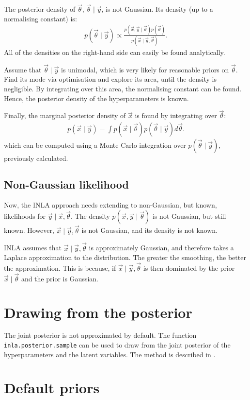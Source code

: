 \documentclass[thesis.tex]{subfiles}
\begin{document}
The posterior density of $\vec{\theta}$, $\vec{\theta }\mid \vec{y}$, is not Gaussian.
Its density (up to a normalising constant) is:
\begin{align}
p(\vec{\theta} \mid \vec{y}) \propto \frac{p(\vec{x}, \vec{y} \mid \vec{\theta}) p(\vec{\theta})}{p(\vec{x} \mid \vec{y}, \vec{\theta})}.
\end{align}
All of the densities on the right-hand side can easily be found analytically.

Assume that $\vec{\theta} \mid \vec{y}$ is unimodal, which is very likely for reasonable priors on $\vec{\theta}$.
Find its mode via optimisation and explore its area, until the density is negligible.
By integrating over this area, the normalising constant can be found.
Hence, the posterior density of the hyperparameters is known.

Finally, the marginal posterior density of $\vec{x}$ is found by integrating over $\vec{\theta}$:
\begin{align}
p(\vec{x} \mid \vec{y}) = \int p(\vec{x} \mid \vec{\theta}) p(\vec{\theta} \mid \vec{y}) d\vec{\theta}.
\end{align}
which can be computed using a Monte Carlo integration over $p(\vec{\theta} \mid \vec{y})$, previously calculated.

\subsection{Non-Gaussian likelihood}

Now, the INLA approach needs extending to non-Gaussian, but known, likelihoods for $\vec{y} \mid \vec{x}, \vec{\theta}$.
The density $p(\vec{x}, \vec{y} \mid \vec{\theta})$ is not Gaussian, but still known.
However, $\vec{x} \mid \vec{y}, \vec{\theta}$ is not Gaussian, and its density is not known.

INLA assumes that $\vec{x} \mid \vec{y}, \vec{\theta}$ is approximately Gaussian, and therefore takes a Laplace approximation to the distribution.
The greater the smoothing, the better the approximation.
This is because, if $\vec{x} \mid \vec{y}, \vec{\theta}$ is then dominated by the prior $\vec{x} \mid \vec{\theta}$ and the prior is Gaussian.


\section{Drawing from the posterior} \label{transmission:sec:INLA:posterior}

The joint posterior is not approximated by default.
The function \texttt{inla.posterior.sample} can be used to draw from the joint posterior of the hyperparameters and the latent variables.
The method is described in \textcite[section 4]{chiuchioloJoint}.

\section{Default priors} \label{transmission:sec:INLA:priors}
\end{document}
